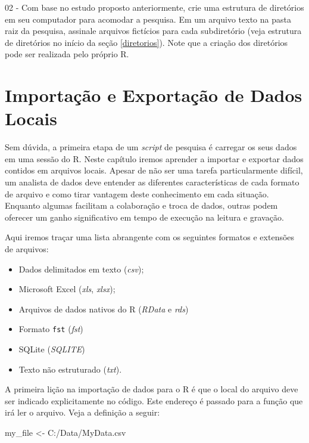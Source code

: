 \documentclass[
  11pt,
]{book}
\newenvironment{Shaded}{\begin{snugshade}}{\end{snugshade}}
\newcommand{\NormalTok}[1]{#1}
\newcommand{\OtherTok}[1]{\textcolor[rgb]{0.37,0.37,0.37}{#1}}
\newcommand{\StringTok}[1]{\textcolor[rgb]{0.5,0.5,0.5}{#1}}
\providecommand{\tightlist}{%
  \setlength{\itemsep}{0pt}\setlength{\parskip}{0pt}}
\begin{document}
02 -
Com base no estudo proposto anteriormente, crie uma estrutura de diretórios em seu computador para acomodar a pesquisa. Em um arquivo texto na pasta raiz da pesquisa, assinale arquivos fictícios para cada subdiretório (veja estrutura de diretórios no início da seção \ref{diretorios}). Note que a criação dos diretórios pode ser realizada pelo próprio R.

\hypertarget{importacao-exportacao}{%
\chapter{Importação e Exportação de Dados Locais}\label{importacao-exportacao}}

Sem dúvida, a primeira etapa de um \emph{script} de pesquisa é carregar os seus dados em uma sessão do R. Neste capítulo iremos aprender a importar e exportar dados contidos em arquivos locais. Apesar de não ser uma tarefa particularmente difícil, um analista de dados deve entender as diferentes características de cada formato de arquivo e como tirar vantagem deste conhecimento em cada situação. Enquanto algumas facilitam a colaboração e troca de dados, outras podem oferecer um ganho significativo em tempo de execução na leitura e gravação.

Aqui iremos traçar uma lista abrangente com os seguintes formatos e extensões de arquivos:

\begin{itemize}
\tightlist
\item
  Dados delimitados em texto (\emph{csv});
\item
  Microsoft Excel (\emph{xls}, \emph{xlsx});
\item
  Arquivos de dados nativos do R (\emph{RData} e \emph{rds})
\item
  Formato \texttt{fst} (\emph{fst})
\item
  SQLite (\emph{SQLITE})
\item
  Texto não estruturado (\emph{txt}).
\end{itemize}

A primeira lição na importação de dados para o R é que o local do arquivo deve ser indicado explicitamente no código. Este endereço é passado para a função que irá ler o arquivo. Veja a definição a seguir:

\begin{Shaded}
\begin{Highlighting}[]
\NormalTok{my\_file }\OtherTok{\textless{}{-}} \StringTok{\textquotesingle{}C:/Data/MyData.csv\textquotesingle{}}
\end{Highlighting}
\end{Shaded}
\end{document}
